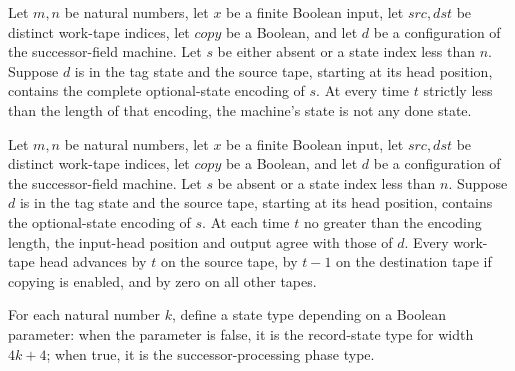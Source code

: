 \begin{lemma}
\label{Turing.StepBlock.succFieldTM_cut}
\leanok
{}
Let $m,n$ be natural numbers, let $x$ be a finite Boolean input, let $src,dst$ be
distinct work-tape indices, let $copy$ be a Boolean, and let $d$ be a configuration of
the successor-field machine. Let $s$ be either absent or a state index less than $n$.
Suppose $d$ is in the tag state and the source tape, starting at its head position,
contains the complete optional-state encoding of $s$. At every time $t$ strictly less
than the length of that encoding, the machine's state is not any done state.
\end{lemma}

\begin{lemma}
\label{Turing.StepBlock.succFieldTM_heads}
\leanok
{}
Let $m,n$ be natural numbers, let $x$ be a finite Boolean input, let $src,dst$ be
distinct work-tape indices, let $copy$ be a Boolean, and let $d$ be a configuration of
the successor-field machine. Let $s$ be absent or a state index less than $n$. Suppose
$d$ is in the tag state and the source tape, starting at its head position, contains the
optional-state encoding of $s$. At each time $t$ no greater than the encoding length,
the input-head position and output agree with those of $d$. Every work-tape head
advances by $t$ on the source tape, by $t-1$ on the destination tape if copying is
enabled, and by zero on all other tapes.
\end{lemma}

\begin{definition}
\label{Turing.StepBlock.SkipPh}
\leanok
{}
For each natural number $k$, define a state type depending on a Boolean parameter: when
the parameter is false, it is the record-state type for width $4k+4$; when true, it is
the successor-processing phase type.
\end{definition}

